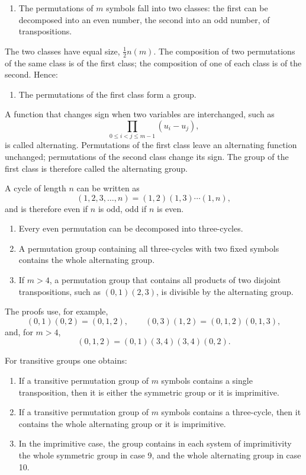 \documentclass[11pt]{article}
\begin{document}
\begin{enumerate}[label=\arabic*.,leftmargin=2em,start=4]
\item The permutations of $m$ symbols fall into two classes: the first can be decomposed into an even number, the second into an odd number, of transpositions.
\end{enumerate}

The two classes have equal size, $\frac12 n(m)$. The composition of two permutations of the same class is of the first class; the composition of one of each class is of the second. Hence:
\begin{enumerate}[label=\arabic*.,leftmargin=2em,start=5]
\item The permutations of the first class form a group.
\end{enumerate}

A function that changes sign when two variables are interchanged, such as
\[
        \prod_{0\le i<j\le m-1}(u_i-u_j),
\]
is called alternating. Permutations of the first class leave an alternating function unchanged; permutations of the second class change its sign. The group of the first class is therefore called the alternating group.

A cycle of length $n$ can be written as
\[
        (1,2,3,
\ldots,n)=(1,2)(1,3)\cdots(1,n),
\]
and is therefore even if $n$ is odd, odd if $n$ is even.

\begin{enumerate}[label=\arabic*.,leftmargin=2em,start=6]
\item Every even permutation can be decomposed into three-cycles.
\item A permutation group containing all three-cycles with two fixed symbols contains the whole alternating group.
\item If $m>4$, a permutation group that contains all products of two disjoint transpositions, such as $(0,1)(2,3)$, is divisible by the alternating group.
\end{enumerate}

The proofs use, for example,
\[
        (0,1)(0,2)=(0,1,2),
        \qquad
        (0,3)(1,2)=(0,1,2)(0,1,3),
\]
and, for $m>4$,
\[
        (0,1,2)=(0,1)(3,4)(3,4)(0,2).
\]

For transitive groups one obtains:
\begin{enumerate}[label=\arabic*.,leftmargin=2em,start=9]
\item If a transitive permutation group of $m$ symbols contains a single transposition, then it is either the symmetric group or it is imprimitive.
\item If a transitive permutation group of $m$ symbols contains a three-cycle, then it contains the whole alternating group or it is imprimitive.
\item In the imprimitive case, the group contains in each system of imprimitivity the whole symmetric group in case 9, and the whole alternating group in case 10.
\end{enumerate}
\end{document}
